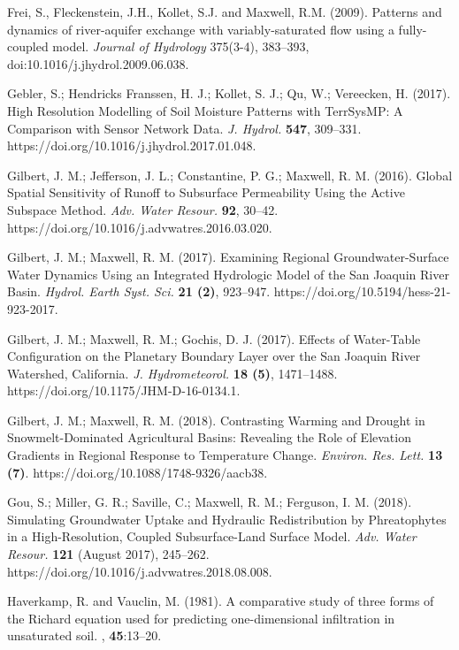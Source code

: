 \begin{thebibliography}{999}
Frei, S., Fleckenstein, J.H., Kollet, S.J. and Maxwell, R.M. (2009). Patterns and dynamics of river-aquifer exchange with variably-saturated flow using a fully-coupled model. {\em Journal of Hydrology} 375(3-4), 383--393, doi:10.1016/j.jhydrol.2009.06.038.

Gebler, S.; Hendricks Franssen, H. J.; Kollet, S. J.; Qu, W.; Vereecken, H. (2017). High Resolution Modelling of Soil Moisture Patterns with TerrSysMP: A Comparison with Sensor Network Data. {\em J. Hydrol.} {\bf 547}, 309–331. https://doi.org/10.1016/j.jhydrol.2017.01.048.


Gilbert, J. M.; Jefferson, J. L.; Constantine, P. G.; Maxwell, R. M. (2016). Global Spatial Sensitivity of Runoff to Subsurface Permeability Using the Active Subspace Method. {\em Adv. Water Resour.} {\bf 92}, 30–42. https://doi.org/10.1016/j.advwatres.2016.03.020.


Gilbert, J. M.; Maxwell, R. M. (2017). Examining Regional Groundwater-Surface Water Dynamics Using an Integrated Hydrologic Model of the San Joaquin River Basin. {\em Hydrol. Earth Syst. Sci.} {\bf 21 (2)}, 923–947. https://doi.org/10.5194/hess-21-923-2017.

Gilbert, J. M.; Maxwell, R. M.; Gochis, D. J. (2017). Effects of Water-Table Configuration on the Planetary Boundary Layer over the San Joaquin River Watershed, California. {\em J. Hydrometeorol.} {\bf 18 (5)}, 1471–1488. https://doi.org/10.1175/JHM-D-16-0134.1.


Gilbert, J. M.; Maxwell, R. M. (2018). Contrasting Warming and Drought in Snowmelt-Dominated Agricultural Basins: Revealing the Role of Elevation Gradients in Regional Response to Temperature Change. {\em Environ. Res. Lett.} {\bf 13 (7)}. https://doi.org/10.1088/1748-9326/aacb38.


Gou, S.; Miller, G. R.; Saville, C.; Maxwell, R. M.; Ferguson, I. M. (2018). Simulating Groundwater Uptake and Hydraulic Redistribution by Phreatophytes in a High-Resolution, Coupled Subsurface-Land Surface Model. {\em Adv. Water Resour.} {\bf 121} (August 2017), 245–262. https://doi.org/10.1016/j.advwatres.2018.08.008.

Haverkamp, R. and Vauclin, M. (1981).
\newblock A comparative study of three forms of the {R}ichard equation used for
  predicting one-dimensional infiltration in unsaturated soil.
, {\bf 45}:13--20.


\end{thebibliography}
